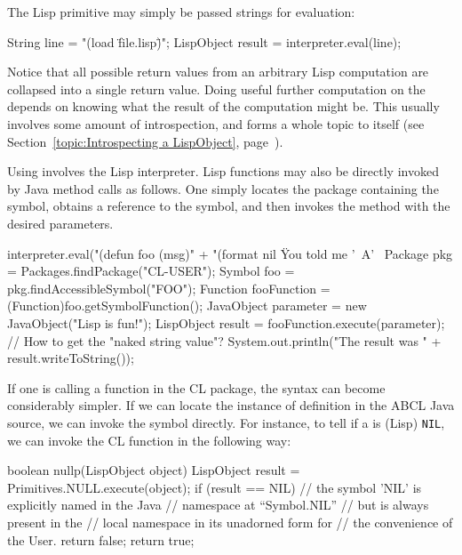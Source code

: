 \documentclass[10pt]{book}
\begin{document}
The Lisp  primitive may simply be passed strings for evaluation:

\begin{listing-java}
  String line = "(load \"file.lisp\")";
  LispObject result = interpreter.eval(line);
\end{listing-java}

Notice that all possible return values from an arbitrary Lisp
computation are collapsed into a single return value.  Doing useful
further computation on the  depends on knowing what the
result of the computation might be.  This usually involves some amount
of  introspection, and forms a whole topic to itself
(see Section~\ref{topic:Introspecting a LispObject},
page~\pageref{topic:Introspecting a LispObject}).

Using  involves the Lisp interpreter.  Lisp functions may
also be directly invoked by Java method calls as follows.  One simply
locates the package containing the symbol, obtains a reference to the
symbol, and then invokes the  method with the desired
parameters.

\begin{listing-java}
  interpreter.eval("(defun foo (msg)" +
    "(format nil \"You told me '~A'~%
  Package pkg = Packages.findPackage("CL-USER");
  Symbol foo = pkg.findAccessibleSymbol("FOO"); 
  Function fooFunction = (Function)foo.getSymbolFunction();
  JavaObject parameter = new JavaObject("Lisp is fun!");
  LispObject result = fooFunction.execute(parameter);
  // How to get the "naked string value"?
  System.out.println("The result was " + result.writeToString()); 
\end{listing-java}

If one is calling a function in the CL package, the syntax can become
considerably simpler.  If we can locate the instance of definition in
the ABCL Java source, we can invoke the symbol directly.  For instance,
to tell if a  is (Lisp) \texttt{NIL}, we can invoke the
CL function  in the following way:

\begin{listing-java}
  boolean nullp(LispObject object) {
    LispObject result = Primitives.NULL.execute(object);
    if (result == NIL) { // the symbol 'NIL' is explicitly named in the Java
                         // namespace at ``Symbol.NIL''
                         // but is always present in the
                         // local namespace in its unadorned form for
                         // the convenience of the User.
      return false;
    }
    return true;
 }
\end{listing-java}
\end{document}
